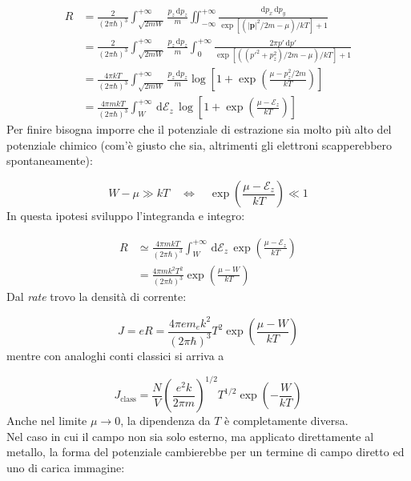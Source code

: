 \documentclass[a4paper]{report}
\begin{document}
\begin{equation}
\begin{split}
        R & = \frac{2}{(2\pi\hbar)^3}\int_{\sqrt{2 m W}}^{+\infty} \frac{p_z\,\mathrm{d}p_z}{m} \iint_{-\infty}^{+\infty}  \frac{\mathrm{d}p_x \,\mathrm{d}p_y}{\exp [(|\mathbf{p}|^2/2m-\mu)/k T]+1} \\
        & =  \frac{2}{(2\pi\hbar)^3}\int_{\sqrt{2 m W}}^{+\infty} \frac{p_z\,\mathrm{d}p_z}{m} \int_{0}^{+\infty}  \frac{2 \pi p' \,\mathrm{d}p'}{\exp [((p'^2+p_z^2)/2m-\mu)/k T]+1} \\
        & = \frac{4\pi k T}{(2\pi\hbar)^3} \int_{\sqrt{2 m W}}^{+\infty} \frac{p_z\,\mathrm{d}p_z}{m}\log\left[1+ \exp\left(\frac{\mu-p_z^2/2m}{k T}\right) \right] \\
        & = \frac{4\pi m k T}{(2\pi\hbar)^3} \int_{W}^{+\infty}\, \mathrm{d}\mathcal{E}_z\,\log\left[1+ \exp\left(\frac{\mu-\mathcal{E}_z}{k T}\right) \right]
\end{split}
\label{rate_termoionico}
\end{equation}
Per finire bisogna imporre che il potenziale di estrazione sia molto più alto del potenziale chimico (com'è giusto che sia, altrimenti gli elettroni scapperebbero spontaneamente):

\begin{equation}
    W-\mu \gg k T \quad \iff \quad \exp\left(\frac{\mu-\mathcal{E}_z}{k T}\right) \ll 1
\end{equation}
In questa ipotesi sviluppo l'integranda e integro:

\begin{equation}
    \begin{split}
        R & \simeq \frac{4\pi m k T}{(2\pi\hbar)^3} \int_{W}^{+\infty}\, \mathrm{d}\mathcal{E}_z\, \exp\left(\frac{\mu-\mathcal{E}_z}{k T}\right) \\
        & = \frac{4\pi m k^2 T^2}{(2\pi\hbar)^3}\exp\left(\frac{\mu-W}{k T}\right)
    \end{split}
\end{equation}
Dal \textit{rate} trovo la densità di corrente:

\begin{equation}
    J = e R = \frac{4\pi e m_e k^2}{(2\pi\hbar)^3} T^2 \exp\left(\frac{\mu-W}{k T}\right)
\end{equation}
mentre con analoghi conti classici si arriva a

\begin{equation}
    J_{\text{class}} = \frac{N}{V} \left(\frac{e^2k}{2\pi m}\right)^{1/2} T^{1/2} \exp\left(-\frac{W}{k T}\right)
\end{equation}
Anche nel limite $\mu\to 0$, la dipendenza da $T$ è completamente diversa.\\
Nel caso in cui il campo non sia solo esterno, ma applicato direttamente al metallo, la forma del potenziale cambierebbe per un termine di campo diretto ed uno di carica immagine:
\end{document}
